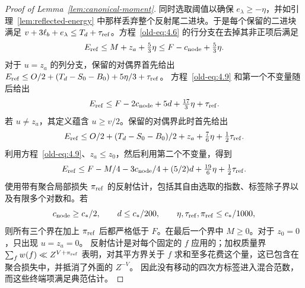 \documentclass[11pt,a4paper]{article}
\numberwithin{equation}{section}
\numberwithin{figure}{section}
\theoremstyle{definition}
\theoremstyle{remark}
\begin{document}
\begin{proof}[Proof of Lemma~\ref{lem:canonical-moment}]
同时选取阈值以确保 \(e_\lambda\ge-\eta\)，并如引理~\ref{lem:reflected-energy} 中那样丢弃整个反射尾二进块。于是每个保留的二进块满足
\(v+3\ell_b+e_\lambda\le T_d+\tau_{\rm ref}\)。方程~\eqref{old-eq:4.6} 的行分支在去掉其非正项后满足
\[
 E_{\rm ref}\le M+z_a+\tfrac53\eta
       \le F-c_{\rm node}+\tfrac53\eta.
\]
对于 \(u=z_a\) 的列分支，保留的对偶界首先给出
\(E_{\rm ref}\le O/2+(T_d-S_0-B_0)+5\eta/3+\tau_{\rm ref}\)。
方程~\eqref{old-eq:4.9} 和第一个不变量随后给出
\begin{equation}\label{old-eq:4.10}
 E_{\rm ref}\le F-2c_{\rm node}+5d+\tfrac{17}{3}\eta+\tau_{\rm ref}.
\end{equation}
若 \(u\ne z_a\)，其定义蕴含 \(u\ge v/2\)。保留的对偶界此时首先给出
\[
 E_{\rm ref}\le O/2+(T_d-S_0-B_0)/2+z_a
                    +\tfrac76\eta+\tfrac12\tau_{\rm ref}.
\]
利用方程~\eqref{old-eq:4.9}、\(z_a\le z_0\)，然后利用第二个不变量，得到
\begin{equation}\label{old-eq:4.11}
 E_{\rm ref}\le F-M/4-3c_{\rm node}/4+(5/2)d
                    +\tfrac{19}{6}\eta+\tfrac12\tau_{\rm ref}.
\end{equation}
使用带有聚合局部损失
\(\pi_{\rm ref}\) 的反射估计，包括其自由选取的指数、标签除子界以及有限多个对数和。若
\[
 c_{\rm node}\ge c_*/2,\qquad
 d\le c_*/200,\qquad \eta,\tau_{\rm ref},\pi_{\rm ref}\le c_*/1000,
\]
则所有三个界在加上 \(\pi_{\rm ref}\) 后都严格低于
\(F\)。在最后一个界中 \(M\ge0\)。对于 \(z_0=0\)，只出现 \(u=z_a=0\)。
反射估计是对每个固定的 \(f\) 应用的；加权质量界 \(\sum_f w(f)\ll Z^{V+\pi_{\rm ref}}\) 表明，对其平方界关于 \(f\) 求和至多花费这个量，这已包含在聚合损失中，并抵消了外面的 \(Z^{-V}\)。
因此没有移动的四次方标签进入混合范数，而这些终端项满足典范估计。


\end{proof}
\end{document}
